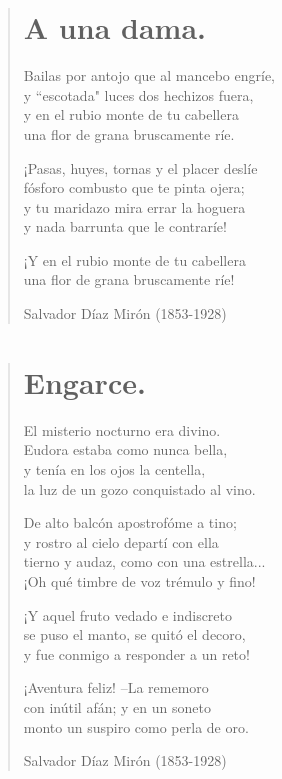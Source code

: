\documentclass[12pt, twoside]{book}
\begin{document}
\newpage
\begin{verse}
\begin{center}
\section{A una dama.}
\end{center}
Bailas por antojo que al mancebo engríe,\\
y ``escotada" luces dos hechizos fuera,\\
y en el rubio monte de tu cabellera\\
una flor de grana bruscamente ríe.
\newline

¡Pasas, huyes, tornas y el placer deslíe\\
fósforo combusto que te pinta ojera;\\
y tu maridazo mira errar la hoguera\\
y nada barrunta que le contraríe!
\newline

¡Y en el rubio monte de tu cabellera\\
una flor de grana bruscamente ríe!
\newline

Salvador Díaz Mirón (1853-1928)
\end{verse}

\newpage
\begin{verse}
\begin{center}
\section{Engarce.}
\end{center}
El misterio nocturno era divino.\\
Eudora estaba como nunca bella,\\
y tenía en los ojos la centella,\\
la luz de un gozo conquistado al vino.
\newline

De alto balcón apostrofóme a tino;\\
y rostro al cielo departí con ella\\
tierno y audaz, como con una estrella...\\
¡Oh qué timbre de voz trémulo y fino!
\newline

¡Y aquel fruto vedado e indiscreto\\
se puso el manto, se quitó el decoro,\\
y fue conmigo a responder a un reto!
\newline

¡Aventura feliz! –La rememoro\\
con inútil afán; y en un soneto\\
monto un suspiro como perla de oro.
\newline

Salvador Díaz Mirón (1853-1928)
\end{verse}
\end{document}
